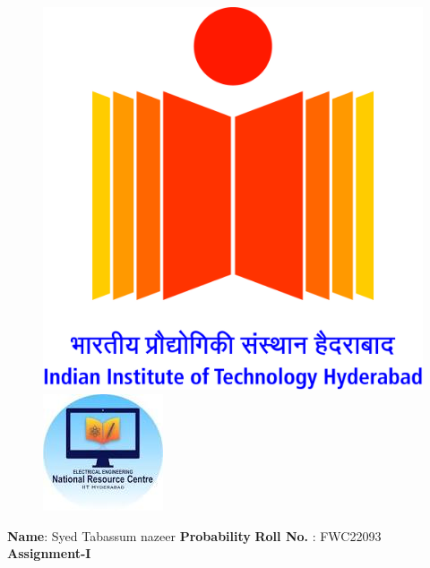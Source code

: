 \documentclass{article}
\numberwithin{table}{enumi}
\begin{document}
\begin{figure}[!tbp]
\centering
\begin{minipage}[b]{0.4\textwidth}
\includegraphics[scale=0.05]{IITH-logo.jpg} 
\end{minipage}
\hfill
\vspace{5mm}\begin{minipage}[b]{0.4\textwidth}
\raggedleft \includegraphics[scale=0.6]{nrc.jpeg} 
\end{minipage}\vspace{0.2cm}
\end{figure}
\raggedright \textbf{Name}:\hspace{1mm} Syed Tabassum nazeer\hspace{3cm} \Large \textbf{Probability}\hspace{1.5cm} %
\normalsize \textbf{Roll No.} :\hspace{0.25mm} FWC22093\vspace{0.25cm}\\
\hspace{8.05cm}\textbf{Assignment-I}
\end{document}
